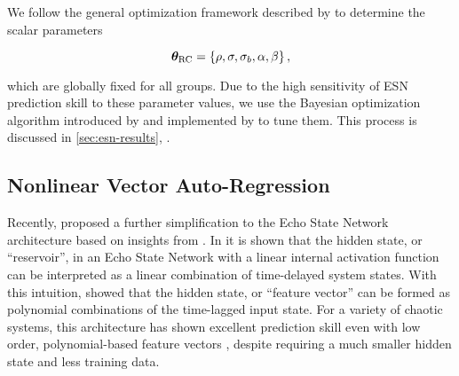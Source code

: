 We follow the general optimization framework described by
\citet{platt_systematic_2022} to determine the scalar parameters
\begin{linenomath*}\begin{equation}
    \bm{\theta}_\text{RC} =
    \{ \rho, \sigma, \sigma_{b}, \alpha, \beta \} \,
    ,
    \label{eq:rc-hyperparameters}
\end{equation}\end{linenomath*}
which are globally fixed for all groups.
Due to the high sensitivity of ESN prediction skill to these parameter values,
we use the Bayesian optimization algorithm introduced by
\citet{jones_efficient_1998} and implemented by \citet{bouhlel_python_2019} to tune them.
This process is discussed in \cref{sec:esn-results}, .

\subsection{Nonlinear Vector Auto-Regression}
\label{subsec:nvar}

Recently, \citet{gauthier_next_2021} proposed a further simplification to the
Echo State Network architecture
based on insights from \citet{bollt_explaining_2021}.
In \citet{bollt_explaining_2021} it is shown that the hidden state, or
``reservoir'', in an Echo State Network with a linear internal activation
function can be interpreted as a linear combination
of time-delayed system states.
With this intuition, \citet{gauthier_next_2021} showed that the hidden state, or
``feature vector'' can be formed as polynomial combinations of the
time-lagged input state.
For a variety of chaotic systems, this architecture has shown excellent prediction skill
even with low order, polynomial-based feature vectors
\citep{chen_next_2022,barbosa_learning_2022,gauthier_next_2021}, despite requiring a much
smaller hidden state and less training data.



